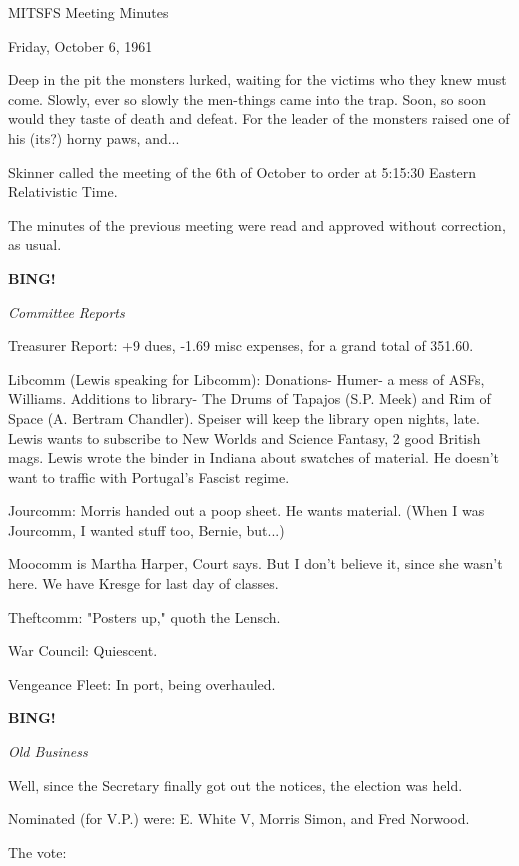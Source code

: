 \documentclass[12pt]{article}
\newcommand{\bing}{{\bf BING!} }
\newcommand{\goto}[1]{\bing \vskip 12pt \centerline{{\em{#1}}}}
\begin{document}
\begin{center}

MITSFS Meeting Minutes

Friday, October 6, 1961

\end{center}
 
\vspace{12pt}

\setlength{\parskip}{6pt}

\noindent
Deep in the pit the monsters lurked, waiting for the victims who they knew must come. Slowly, ever so slowly the men-things came into the trap. Soon, so soon would they taste of death and defeat. For the leader of the monsters raised one of his (its?) horny paws, and...

Skinner called the meeting of the 6th of October to order at 5:15:30 Eastern Relativistic Time.

The minutes of the previous meeting were read and approved without correction, as usual.

\goto{Committee Reports}

Treasurer Report: +9 dues, -1.69 misc expenses, for a grand total of 351.60.

Libcomm (Lewis speaking for Libcomm): Donations- Humer- a mess of ASFs, Williams. Additions to library- The Drums of Tapajos (S.P. Meek) and Rim of Space (A. Bertram Chandler). Speiser will keep the library open nights, late. Lewis wants to subscribe to New Worlds and Science Fantasy, 2 good British mags. Lewis wrote the binder in Indiana about swatches of material. He doesn't want to traffic with Portugal's Fascist regime.

Jourcomm: Morris handed out a poop sheet. He wants material. (When I was Jourcomm, I wanted stuff too, Bernie, but...)

Moocomm is Martha Harper, Court says. But I don't believe it, since she wasn't here. We have Kresge for last day of classes.

Theftcomm: "Posters up," quoth the Lensch.

War Council: Quiescent.

Vengeance Fleet: In port, being overhauled.

\goto{Old Business}

Well, since the Secretary finally got out the notices, the election was held.

Nominated (for V.P.) were: E. White V, Morris Simon, and Fred Norwood.

The vote:
\end{document}
